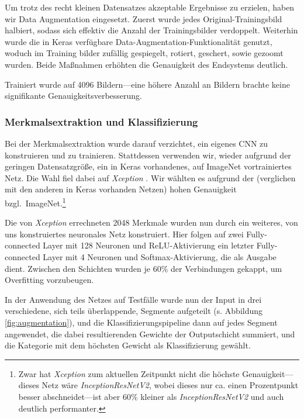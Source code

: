 \documentclass[a4,german]{article}
\begin{document}
Um trotz des recht kleinen Datensatzes akzeptable Ergebnisse zu erzielen, haben wir Data Augmentation eingesetzt.
Zuerst wurde jedes Original-Trainingsbild halbiert, sodass sich effektiv die Anzahl der Trainingsbilder verdoppelt.
Weiterhin wurde die in Keras verfügbare Data-Augmentation-Funktionalität genutzt, woduch im Training bilder zufällig gespiegelt, rotiert, geschert, sowie gezoomt wurden.
Beide Maßnahmen erhöhten die Genauigkeit des Endsystems deutlich.

Trainiert wurde auf 4096 Bildern---eine höhere Anzahl an Bildern brachte keine signifikante Genauigkeitsverbesserung.


\subsubsection{Merkmalsextraktion und Klassifizierung}
\label{sec:neural}

Bei der Merkmalsextraktion wurde darauf verzichtet, ein eigenes CNN zu konstruieren und zu trainieren.
Stattdessen verwenden wir, wieder aufgrund der geringen Datensatzgröße, ein in Keras vorhandenes, auf ImageNet vortrainiertes Netz.
Die Wahl fiel dabei auf \emph{Xception} \cite{xception}.
Wir wählten es aufgrund der (verglichen mit den anderen in Keras vorhanden Netzen) hohen Genauigkeit bzgl.\ ImageNet.\footnote{Zwar hat \emph{Xception} zum aktuellen Zeitpunkt nicht die höchste Genauigkeit---dieses Netz wäre \emph{InceptionResNetV2}, wobei dieses nur ca. einen Prozentpunkt besser abschneidet---ist aber 60\% kleiner als \emph{InceptionResNetV2} und auch deutlich performanter.}

Die von \emph{Xception} errechneten 2048 Merkmale wurden nun durch ein weiteres, von uns konstruiertes neuronales Netz konstruiert.
Hier folgen auf zwei Fully-connected Layer mit 128 Neuronen und ReLU-Aktivierung ein letzter Fully-connected Layer mit 4 Neuronen und Softmax-Aktivierung, die als Ausgabe dient.
Zwischen den Schichten wurden je 60\% der Verbindungen gekappt, um Overfitting vorzubeugen.


In der Anwendung des Netzes auf Testfälle wurde nun der Input in drei verschiedene, sich teils überlappende, Segmente aufgeteilt (s. Abbildung \ref{fig:augmentation}), und die Klassifizierungspipeline dann auf jedes Segment angewendet, die dabei resultierenden Gewichte der Outputschicht summiert, und die Kategorie mit dem höchsten Gewicht als Klassifizierung gewählt.
\end{document}
